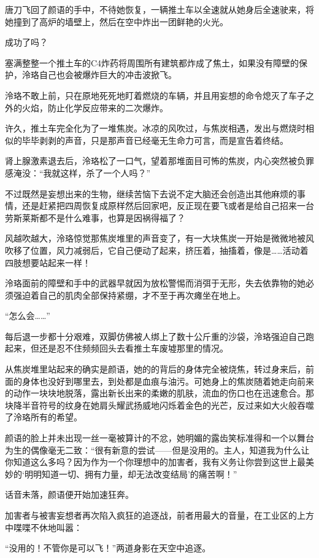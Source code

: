 \documentclass[UTF8, scheme = chinese, openany]{ctexbook}
\begin{document}
唐刀飞回了颜语的手中，不待她恢复，一辆推土车以全速就从她身后全速驶来，将她撞到了高炉的墙壁上，然后在空中炸出一团鲜艳的火光。

成功了吗？

塞满整整一个推土车的C4炸药将周围所有建筑都炸成了焦土，如果没有障壁的保护，泠珞自己也会被爆炸巨大的冲击波掀飞。

泠珞不敢上前，只在原地死死地盯着燃烧的车辆，并且用妄想的命令熄灭了车子之外的火焰，防止化学反应带来的二次爆炸。

许久，推土车完全化为了一堆焦炭。冰凉的风吹过，与焦炭相遇，发出与燃烧时相似的毕毕剥剥的声音，只是那声音已经毫无生命力可言，而是宣告着终结。

肾上腺激素退去后，泠珞松了一口气，望着那堆面目可怖的焦炭，内心突然被负罪感淹没：“我就这样，杀了一个人吗？”

不过既然是妄想出来的生物，继续苦恼下去说不定大脑还会创造出其他麻烦的事情，还是赶紧把四周恢复成原样然后回家吧，反正现在要飞或者是给自己招来一台劳斯莱斯都不是什么难事，也算是因祸得福了？

风越吹越大，泠珞惊觉那焦炭堆里的声音变了，有一大块焦炭一开始是微微地被风吹移了位置，风力减弱后，它自己便动了起来，挤压着，抽搐着，像是……活动着四肢想要站起来一样！

泠珞面前的障壁和手中的武器早就因为放松警惕而消弭于无形，失去依靠物的她必须强迫着自己的肌肉全部保持紧绷，才不至于再次瘫坐在地上。

“怎么会……”

每后退一步都十分艰难，双脚仿佛被人绑上了数十公斤重的沙袋，泠珞强迫自己跑起来，但还是忍不住频频回头去看推土车废墟那里的情况。

从焦炭堆里站起来的确实是颜语，她的的背后的身体完全被烧焦，转过身来后，前面的身体也没好到哪里去，到处都是血痕与油污。可她身上的焦炭随着她走向前来的动作一块块地脱落，露出新长出来的柔嫩的肌肤，流血的伤口也在迅速愈合。那块降半音符号的纹身在她肩头耀武扬威地闪烁着金色的光芒，反过来如大火般吞噬了泠珞所有的希望。

颜语的脸上并未出现一丝一毫被算计的不忿，她明媚的露齿笑标准得和一个以舞台为生的偶像毫无二致：“很有新意的尝试——但是没用的。主人，知道我为什么让你知道这么多吗？因为作为一个你理想中的加害者，我有义务让你尝到这世上最美妙的‘明明知道一切、拥有力量，却无法改变结局’的痛苦啊！”

话音未落，颜语便开始加速狂奔。

加害者与被害妄想者再次陷入疯狂的追逐战，前者用最大的音量，在工业区的上方中喋喋不休地叫嚣：

“没用的！不管你是可以飞！”两道身影在天空中追逐。
\end{document}
